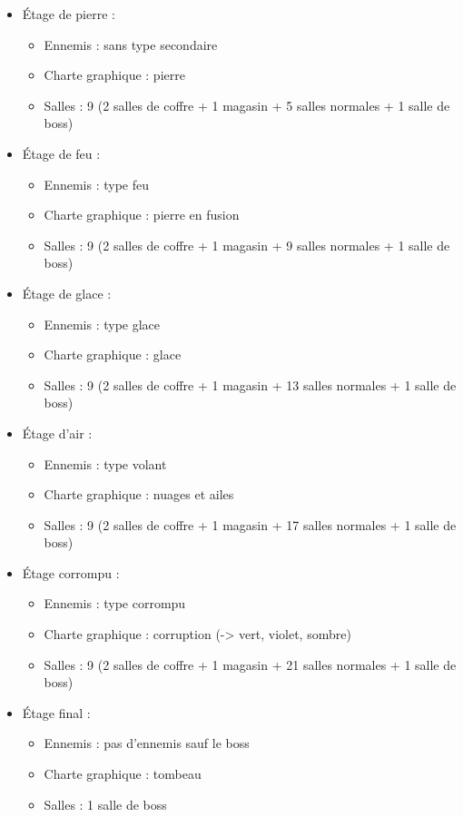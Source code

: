 \documentclass[]{extarticle}
\begin{document}
\begin{itemize}
\item Étage de pierre :
\begin{itemize}
\item Ennemis : sans type secondaire
\item Charte graphique : pierre
\item Salles : 9 (2 salles de coffre + 1 magasin + 5 salles normales + 1 salle de boss)
\end{itemize}
\bigbreak
\item Étage de feu :
\begin{itemize}
\item Ennemis : type feu
\item Charte graphique : pierre en fusion
\item Salles : 9 (2 salles de coffre + 1 magasin + 9 salles normales + 1 salle de boss)
\end{itemize}
\bigbreak
\item Étage de glace :
\begin{itemize}
\item Ennemis : type glace
\item Charte graphique : glace
\item Salles : 9 (2 salles de coffre + 1 magasin + 13 salles normales + 1 salle de boss)
\end{itemize}
\bigbreak
\item Étage d’air :
\begin{itemize}
\item Ennemis : type volant
\item Charte graphique : nuages et ailes
\item Salles : 9 (2 salles de coffre + 1 magasin + 17 salles normales + 1 salle de boss)
\end{itemize}
\bigbreak
\item Étage corrompu :
\begin{itemize}
\item Ennemis : type corrompu
\item Charte graphique : corruption (-> vert, violet, sombre)
\item Salles : 9 (2 salles de coffre + 1 magasin + 21 salles normales + 1 salle de boss)
\end{itemize}
\bigbreak
\item Étage final :
\begin{itemize}
\item Ennemis : pas d’ennemis sauf le boss
\item Charte graphique : tombeau
\item Salles : 1 salle de boss
\end{itemize}
\end{itemize}
\end{document}
